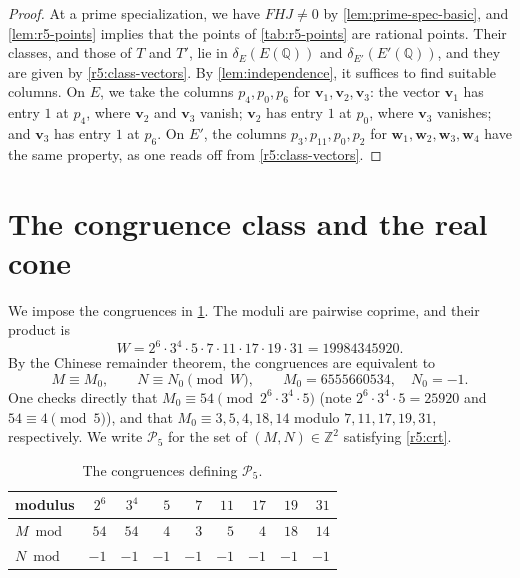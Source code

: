 \documentclass[12pt,oneside,openany]{book}
\theoremstyle{definition}
\theoremstyle{plain}
\numberwithin{equation}{chapter}
\theoremstyle{plain}
\theoremstyle{definition}
\theoremstyle{remark}
\newcommand{\Q}{\mathbb Q}
\newcommand{\Z}{\mathbb Z}
\newcommand{\cP}{\mathcal P}
\begin{document}
\begin{proof}
At a prime specialization, we have $FHJ\ne0$ by \cref{lem:prime-spec-basic}, and \cref{lem:r5-points} implies that the points of \cref{tab:r5-points} are rational points. Their classes, and those of $T$ and $T'$, lie in $\delta_E(E(\Q))$ and $\delta_{E'}(E'(\Q))$, and they are given by \eqref{r5:class-vectors}. By \cref{lem:independence}, it suffices to find suitable columns. On $E$, we take the columns $p_4,p_0,p_6$ for $\mathbf v_1,\mathbf v_2,\mathbf v_3$: the vector $\mathbf v_1$ has entry $1$ at $p_4$, where $\mathbf v_2$ and $\mathbf v_3$ vanish; $\mathbf v_2$ has entry $1$ at $p_0$, where $\mathbf v_3$ vanishes; and $\mathbf v_3$ has entry $1$ at $p_6$. On $E'$, the columns $p_3,p_{11},p_0,p_2$ for $\mathbf w_1,\mathbf w_2,\mathbf w_3,\mathbf w_4$ have the same property, as one reads off from \eqref{r5:class-vectors}.
\end{proof}

\section{The congruence class and the real cone}\label{sec:r5-progression}

We impose the congruences in \cref{tab:r5-crt}. The moduli are pairwise coprime, and their product is
\[
W=2^6\cdot3^4\cdot5\cdot7\cdot11\cdot17\cdot19\cdot31=19984345920.
\]
By the Chinese remainder theorem, the congruences are equivalent to
\begin{equation}\label{r5:crt}
M\equiv M_0,\qquad N\equiv N_0\pmod W,\qquad M_0=6555660534,\quad N_0=-1.
\end{equation}
One checks directly that $M_0\equiv54\pmod{2^6\cdot3^4\cdot5}$ (note $2^6\cdot3^4\cdot5=25920$ and $54\equiv4\pmod5$), and that $M_0\equiv3,5,4,18,14$ modulo $7,11,17,19,31$, respectively. We write $\cP_5$ for the set of $(M,N)\in\Z^2$ satisfying \eqref{r5:crt}.

\begin{table}[htbp]
\centering
\caption{The congruences defining $\cP_5$.}\label{tab:r5-crt}
\begin{tabular}{l*{8}{r}}
\toprule
modulus & $2^6$ & $3^4$ & $5$ & $7$ & $11$ & $17$ & $19$ & $31$\\
\midrule
$M\bmod{}$ & $54$ & $54$ & $4$ & $3$ & $5$ & $4$ & $18$ & $14$\\
$N\bmod{}$ & $-1$ & $-1$ & $-1$ & $-1$ & $-1$ & $-1$ & $-1$ & $-1$\\
\bottomrule
\end{tabular}
\end{table}
\end{document}
